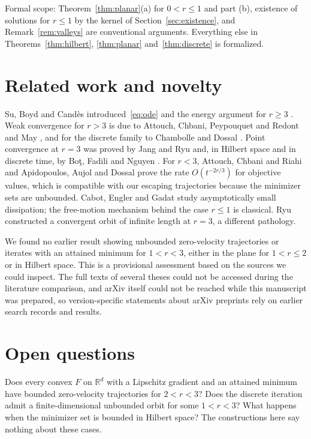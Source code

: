 \documentclass[11pt]{article}
\numberwithin{equation}{section}
\theoremstyle{definition}
\theoremstyle{remark}
\newcommand{\R}{\mathbb R}
\begin{document}
Formal scope: Theorem~\ref{thm:planar}(a) for $0<r\le1$ and part (b), existence of solutions for $r\le1$ by the kernel of Section~\ref{sec:existence}, and Remark~\ref{rem:valleys} are conventional arguments. Everything else in Theorems~\ref{thm:hilbert}, \ref{thm:planar} and~\ref{thm:discrete} is formalized.

\section{Related work and novelty}\label{sec:related}
Su, Boyd and Cand\`es introduced~\eqref{eq:ode} and the energy argument for $r\ge3$ \cite{SBC}. Weak convergence for $r>3$ is due to Attouch, Chbani, Peypouquet and Redont \cite{ACPR} and May \cite{May}, and for the discrete family to Chambolle and Dossal \cite{ChambolleDossal}. Point convergence at $r=3$ was proved by Jang and Ryu \cite{JangRyu} and, in Hilbert space and in discrete time, by Bo\c{t}, Fadili and Nguyen \cite{BFN}. For $r<3$, Attouch, Chbani and Riahi \cite{ACR} and Apidopoulos, Aujol and Dossal \cite{AAD} prove the rate $O(t^{-2r/3})$ for objective values, which is compatible with our escaping trajectories because the minimizer sets are unbounded. Cabot, Engler and Gadat \cite{CEG} study asymptotically small dissipation; the free-motion mechanism behind the case $r\le1$ is classical. Ryu \cite{Ryu} constructed a convergent orbit of infinite length at $r=3$, a different pathology.

We found no earlier result showing unbounded zero-velocity trajectories or iterates with an attained minimum for $1<r<3$, either in the plane for $1<r\le2$ or in Hilbert space. This is a provisional assessment based on the sources we could inspect. The full texts of several theses could not be accessed during the literature comparison, and arXiv itself could not be reached while this manuscript was prepared, so version-specific statements about arXiv preprints rely on earlier search records and results.

\section{Open questions}\label{sec:open}
Does every convex $F$ on $\R^d$ with a Lipschitz gradient and an attained minimum have bounded zero-velocity trajectories for $2<r<3$? Does the discrete iteration admit a finite-dimensional unbounded orbit for some $1<r<3$? What happens when the minimizer set is bounded in Hilbert space? The constructions here say nothing about these cases.
\end{document}
